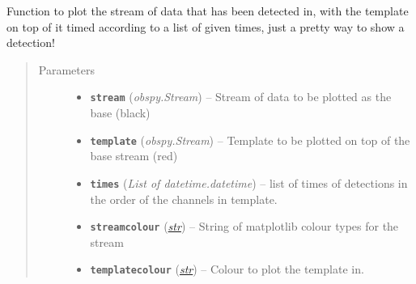 \documentclass[a4paper,10pt,english]{sphinxmanual}
\begin{document}
\begin{fulllineitems}
\label{utils:EQcorrscan_plotting.detection_multiplot}
Function to plot the stream of data that has been detected in, with the
template on top of it timed according to a list of given times, just a
pretty way to show a detection!
\begin{quote}\begin{description}
\item[{Parameters}] \leavevmode\begin{itemize}
\item {} 
\textbf{\texttt{stream}} (\emph{obspy.Stream}) -- Stream of data to be plotted as the base (black)

\item {} 
\textbf{\texttt{template}} (\emph{obspy.Stream}) -- Template to be plotted on top of the base stream (red)

\item {} 
\textbf{\texttt{times}} (\emph{List of datetime.datetime}) -- list of times of detections in the order of the channels in
template.

\item {} 
\textbf{\texttt{streamcolour}} (\href{https://docs.python.org/library/functions.html\#str}{\emph{str}}) -- String of matplotlib colour types for the stream

\item {} 
\textbf{\texttt{templatecolour}} (\href{https://docs.python.org/library/functions.html\#str}{\emph{str}}) -- Colour to plot the template in.

\end{itemize}

\end{description}\end{quote}

\end{fulllineitems}

\end{document}
